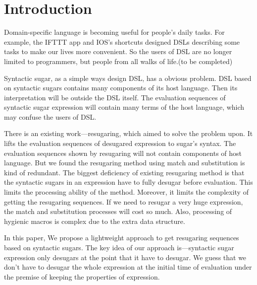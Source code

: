 \section{Introduction}







Domain-specific language\cite{dsl} is becoming useful for people's daily tasks. For example, the IFTTT app and IOS's shortcuts designed DSLs describing some tasks to make our lives more convenient. So the users of DSL are no longer limited to programmers, but people from all walks of life.(to be completed)

Syntactic sugar\cite{syntacticsugar}, as a simple ways design DSL, has a obvious problem. DSL based on syntactic sugars contains many components of its host language. Then its interpretation will be outside the DSL itself. The evaluation sequences of syntactic sugar expression will contain many terms of the host language, which may confuse the users of DSL.

There is an existing work---resugaring\cite{resugaring}\cite{hygienic}, which aimed to solve the problem upon. It lifts the evaluation sequences of desugared expression to sugar's syntax. The evaluation sequences shown by resugaring will not contain components of host language. But we found the resugaring method using match and substitution is kind of redundant. The biggest deficiency of existing resugaring method is that the syntactic sugars in an expression have to fully desugar before evaluation. This limits the processing ability of the method. Moreover, it limits the complexity of getting the resugaring sequences. If we need to resugar a very huge expression, the match and substitution processes will cost so much. Also, processing of hygienic macros is complex due to the extra data structure.

In this paper, We propose a lightweight approach to get resugaring sequences based on syntactic sugars. The key idea of our approach is---syntactic sugar expression only desugars at the point that it have to desugar. We guess that we don't have to desugar the whole expression at the initial time of evaluation under the premise of keeping the properties of expression. 

